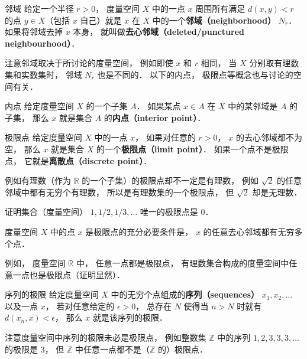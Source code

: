 \begin{definition}{邻域}
给定一个半径 $r > 0$， 度量空间 $X$ 中的一点 $x$ 周围所有满足 $d(x, y) < r$ 的点 $y \in X$（包括 $x$ 自己）就是 $x$ 在 $X$ 中的一个\textbf{邻域（neighborhood）} $N_r$． 如果将邻域去掉 $x$ 本身， 就叫做\textbf{去心邻域（deleted/punctured neighbourhood）}．
\end{definition}
注意邻域取决于所讨论的度量空间， 例如即使 $x$ 和 $r$ 相同， 当 $X$ 分别取有理数集和实数集时， 邻域 $N_r$ 也是不同的． 以下的内点， 极限点等概念也与讨论的空间有关．

\begin{definition}{内点}
给定度量空间 $X$ 的一个子集 $A$． 如果某点 $x\in A$ 在 $X$ 中的某邻域是 $A$ 的子集， 那么 $x$ 就是集合 $A$ 的\textbf{内点（interior point）}．
\end{definition}

\begin{definition}{极限点}
给定度量空间 $X$ 中的一点 $x$， 如果对任意的 $r > 0$， $x$ 的去心邻域都不为空， 那么 $x$ 就是集合 $X$ 的一个\textbf{极限点（limit point）}． 如果一个点不是极限点， 它就是\textbf{离散点（discrete point）}．
\end{definition}
例如有理数（作为 $\mathbb R$ 的一个子集）的极限点却不一定是有理数， 例如 $\sqrt{2}$ 的任意邻域中都有无穷个有理数， 所以是有理数集的一个极限点， 但 $\sqrt{2}$ 却是无理数．

\begin{exercise}{}
证明集合（度量空间） ${1, 1/2, 1/3, \dots}$ 唯一的极限点是 $0$．
\end{exercise}

\begin{corollary}{}
度量空间 $X$ 中的点 $x$ 是极限点的充分必要条件是， $x$ 的任意去心邻域都有无穷多个点．
\end{corollary}

例如， 度量空间 $\mathbb R$ 中， 任意一点都是极限点， 有理数集合构成的度量空间中任意一点也是极限点（证明显然）．

\begin{definition}{序列的极限}
给定度量空间 $X$ 中的无穷个点组成的\textbf{序列（sequences）} $x_1, x_2, \dots$ 以及一点 $x$， 若对任意给定的 $\epsilon > 0$， 总存在 $N$ 使得当 $n > N$ 时就有 $d(x_n, x) < \epsilon$， 那么 $x$ 就是该序列的极限．
\end{definition}
注意度量空间中序列的极限未必是极限点， 例如整数集 $\mathbb Z$ 中的序列 $1, 2, 3, 3, 3, \dots$ 的极限是 $3$， 但 $\mathbb Z$ 中任意一点都不是（$\mathbb Z$ 的）极限点．


